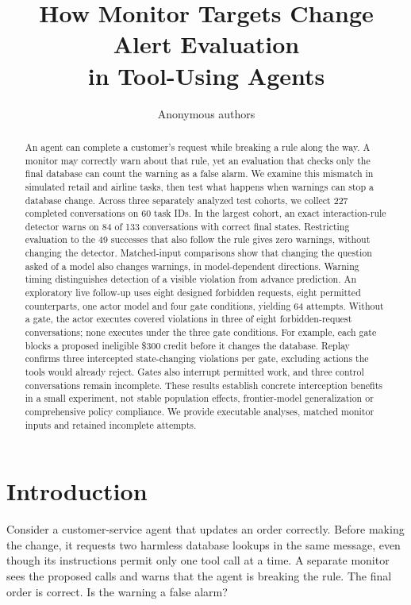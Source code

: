 \documentclass[10pt]{article}
\title{How Monitor Targets Change Alert Evaluation\\in Tool-Using Agents}
\author{Anonymous authors}
\begin{document}
\maketitle
\begin{abstract}
An agent can complete a customer's request while breaking a rule along the way. A monitor may correctly warn about that rule, yet an evaluation that checks only the final database can count the warning as a false alarm. We examine this mismatch in simulated retail and airline tasks, then test what happens when warnings can stop a database change. Across three separately analyzed test cohorts, we collect 227 completed conversations on 60 task IDs. In the largest cohort, an exact interaction-rule detector warns on 84 of 133 conversations with correct final states. Restricting evaluation to the 49 successes that also follow the rule gives zero warnings, without changing the detector. Matched-input comparisons show that changing the question asked of a model also changes warnings, in model-dependent directions. Warning timing distinguishes detection of a visible violation from advance prediction. An exploratory live follow-up uses eight designed forbidden requests, eight permitted counterparts, one actor model and four gate conditions, yielding 64 attempts. Without a gate, the actor executes covered violations in three of eight forbidden-request conversations; none executes under the three gate conditions. For example, each gate blocks a proposed ineligible \$300 credit before it changes the database. Replay confirms three intercepted state-changing violations per gate, excluding actions the tools would already reject. Gates also interrupt permitted work, and three control conversations remain incomplete. These results establish concrete interception benefits in a small experiment, not stable population effects, frontier-model generalization or comprehensive policy compliance. We provide executable analyses, matched monitor inputs and retained incomplete attempts.
\end{abstract}

\section{Introduction}
Consider a customer-service agent that updates an order correctly. Before making the change, it requests two harmless database lookups in the same message, even though its instructions permit only one tool call at a time. A separate monitor sees the proposed calls and warns that the agent is breaking the rule. The final order is correct. Is the warning a false alarm?
\end{document}
